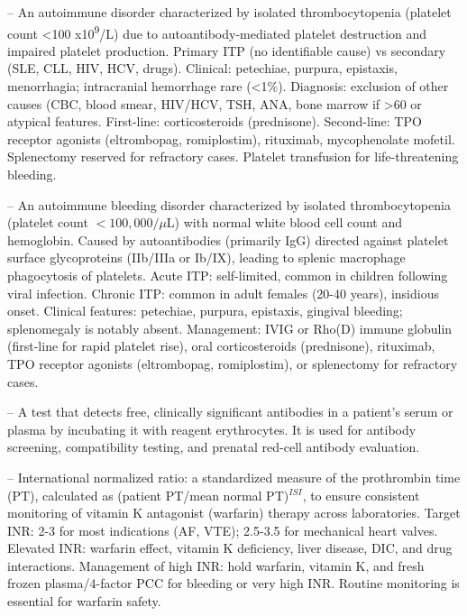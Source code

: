 -- An autoimmune disorder characterized by isolated thrombocytopenia (platelet count <100 x10\textsuperscript{9}/L) due to autoantibody-mediated platelet destruction and impaired platelet production. Primary ITP (no identifiable cause) vs secondary (SLE, CLL, HIV, HCV, drugs). Clinical: petechiae, purpura, epistaxis, menorrhagia; intracranial hemorrhage rare (<1\%). Diagnosis: exclusion of other causes (CBC, blood smear, HIV/HCV, TSH, ANA, bone marrow if >60 or atypical features. First-line: corticosteroids (prednisone). Second-line: TPO receptor agonists (eltrombopag, romiplostim), rituximab, mycophenolate mofetil. Splenectomy reserved for refractory cases. Platelet transfusion for life-threatening bleeding.

-- An autoimmune bleeding disorder characterized by isolated thrombocytopenia (platelet count $<100,000/\mu\text{L}$) with normal white blood cell count and hemoglobin. Caused by autoantibodies (primarily IgG) directed against platelet surface glycoproteins (IIb/IIIa or Ib/IX), leading to splenic macrophage phagocytosis of platelets. Acute ITP: self-limited, common in children following viral infection. Chronic ITP: common in adult females (20-40 years), insidious onset. Clinical features: petechiae, purpura, epistaxis, gingival bleeding; splenomegaly is notably absent. Management: IVIG or Rho(D) immune globulin (first-line for rapid platelet rise), oral corticosteroids (prednisone), rituximab, TPO receptor agonists (eltrombopag, romiplostim), or splenectomy for refractory cases.

-- A test that detects free, clinically significant antibodies in a patient’s serum or plasma by incubating it with reagent erythrocytes. It is used for antibody screening, compatibility testing, and prenatal red-cell antibody evaluation.

-- International normalized ratio: a standardized measure of the prothrombin time (PT), calculated as (patient PT/mean normal PT)$^{ISI}$, to ensure consistent monitoring of vitamin K antagonist (warfarin) therapy across laboratories. Target INR: 2-3 for most indications (AF, VTE); 2.5-3.5 for mechanical heart valves. Elevated INR: warfarin effect, vitamin K deficiency, liver disease, DIC, and drug interactions. Management of high INR: hold warfarin, vitamin K, and fresh frozen plasma/4-factor PCC for bleeding or very high INR. Routine monitoring is essential for warfarin safety.

